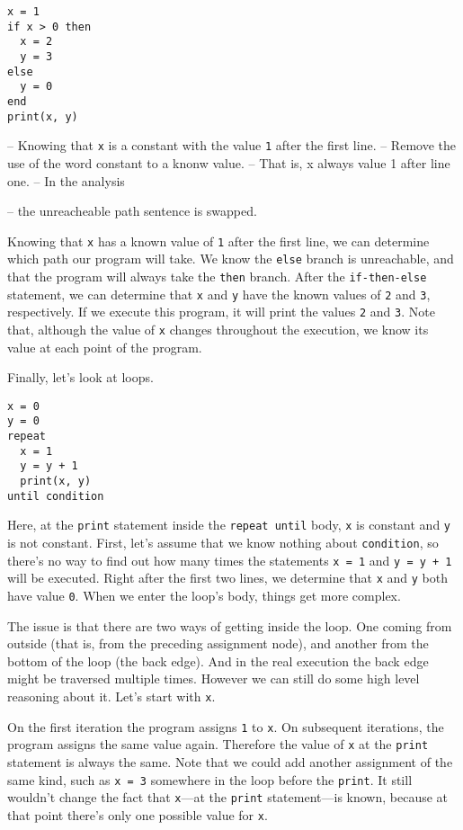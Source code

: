 \documentclass[
]{article}
\begin{document}
\begin{verbatim}
x = 1
if x > 0 then
  x = 2
  y = 3
else
  y = 0
end
print(x, y)
\end{verbatim}

-- Knowing that \texttt{x} is a constant with the value \texttt{1} after
the first line. -- Remove the use of the word constant to a knonw value.
-- That is, x always value 1 after line one. -- In the analysis

-- the unreacheable path sentence is swapped.

Knowing that \texttt{x} has a known value of \texttt{1} after the first
line, we can determine which path our program will take. We know the
\texttt{else} branch is unreachable, and that the program will always
take the \texttt{then} branch. After the \texttt{if-then-else}
statement, we can determine that \texttt{x} and \texttt{y} have the
known values of \texttt{2} and \texttt{3}, respectively. If we execute
this program, it will print the values \texttt{2} and \texttt{3}. Note
that, although the value of \texttt{x} changes throughout the execution,
we know its value at each point of the program.

Finally, let's look at loops.

\begin{verbatim}
x = 0
y = 0
repeat
  x = 1
  y = y + 1
  print(x, y)
until condition
\end{verbatim}

Here, at the \texttt{print} statement inside the \texttt{repeat\ until}
body, \texttt{x} is constant and \texttt{y} is not constant. First,
let's assume that we know nothing about \texttt{condition}, so there's
no way to find out how many times the statements \texttt{x\ =\ 1} and
\texttt{y\ =\ y\ +\ 1} will be executed. Right after the first two
lines, we determine that \texttt{x} and \texttt{y} both have value
\texttt{0}. When we enter the loop's body, things get more complex.

The issue is that there are two ways of getting inside the loop. One
coming from outside (that is, from the preceding assignment node), and
another from the bottom of the loop (the back edge). And in the real
execution the back edge might be traversed multiple times. However we
can still do some high level reasoning about it. Let's start with
\texttt{x}.

On the first iteration the program assigns \texttt{1} to \texttt{x}. On
subsequent iterations, the program assigns the same value again.
Therefore the value of \texttt{x} at the \texttt{print} statement is
always the same. Note that we could add another assignment of the same
kind, such as \texttt{x\ =\ 3} somewhere in the loop before the
\texttt{print}. It still wouldn't change the fact that \texttt{x}---at
the \texttt{print} statement---is known, because at that point there's
only one possible value for \texttt{x}.
\end{document}
